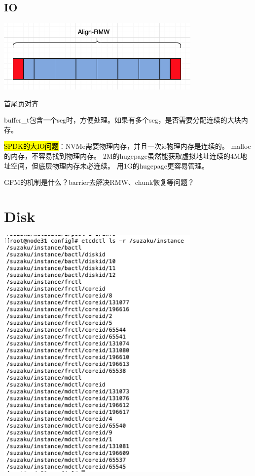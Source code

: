 \subsection{IO}

\begin{center}
\includegraphics[width=10cm]{../imgs/io-align.png}
\end{center}

首尾页对齐

buffer\_t包含一个seg时，方便处理。如果有多个seg，是否需要分配连续的大块内存。

\hl{SPDK的大IO问题}：NVMe需要物理内存，并且一次io物理内存是连续的。
malloc的内存，不容易找到物理内存。
2M的hugepage虽然能获取虚拟地址连续的4M地址空间，但底层物理内存未必连续。
用1G的hugepage更容易管理。

GFM的机制是什么？barrier去解决RMW、chunk恢复等问题？

\section{Disk}

\begin{center}
\includegraphics[width=10cm]{../imgs/etcd-suzaku-instance.png}
\end{center}

